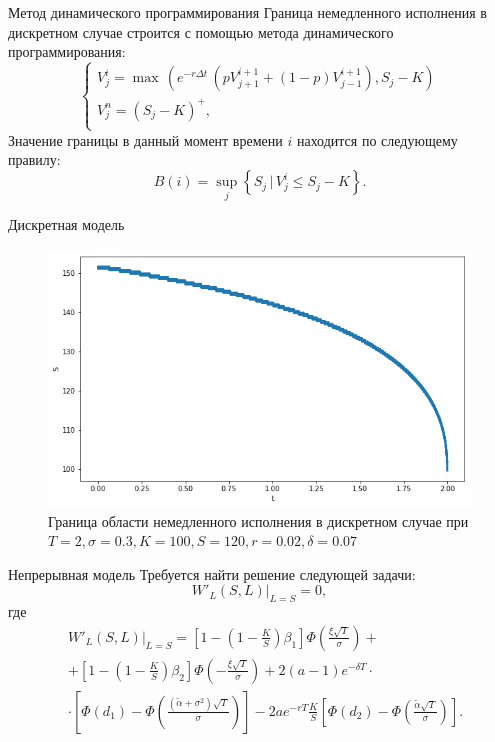 \documentclass[12pt]{beamer}
\begin{document}
\begin{frame}{Метод динамического программирования}
    Граница немедленного исполнения в дискретном случае строится с помощью метода динамического программирования:
    \begin{equation*}
		\begin{cases}
		V_j^i = \max\,(e^{-r\Delta t} \, (pV_{j+1}^{i+1}+(1-p)V_{j-1}^{i+1}),S_j-K) \\
		V_j^n = (S_j-K)^+, \\
		\end{cases}
    \end{equation*}
    Значение границы в данный момент времени $i$ находится по следующему правилу:
    $$ B(i) = \sup_j \left\{ S_j \, | \, V^i_j \leq S_j - K \right\}.$$
\end{frame}

\begin{frame}{Дискретная модель}
    \begin{figure}[h]
        \centering
        \includegraphics[scale=0.4]{Discrete.png}
        \caption{Граница области немедленного исполнения в дискретном случае при $T=2, \sigma=0.3, K=100, S=120, r=0.02, \delta=0.07$}
        \label{descrete}
    \end{figure} 
\end{frame}

\begin{frame}{Непрерывная модель}
    Требуется найти решение следующей задачи:
    $$ W'_L(S,L)\bigg|_{L=S}=0,$$
    где
    \footnotesize
    \begin{align*}
        & W'_L(S,L)\bigg|_{L=S} = \left[ 1 - \left(1-\frac{K}{S} \right)\beta_1 \right] \Phi\left(\frac{\xi\sqrt{T}}{\sigma}\right) + \\
        & + \left[ 1 - \left(1-\frac{K}{S} \right)\beta_2 \right] \Phi\left(-\frac{\xi\sqrt{T}}{\sigma}\right) + 2(a-1)e^{-\delta T} \cdot \\ 
        & \cdot \left[ \Phi\left(d_1\right) - \Phi\left(\frac{(\widetilde{\alpha}+\sigma^2)\sqrt{T}}{\sigma}\right) \right] - 2ae^{-rT}\frac{K}{S} \left[ \Phi\left(d_2\right) - \Phi\left(\frac{\widetilde{\alpha}\sqrt{T}}{\sigma}\right) \right].
    \end{align*}
\end{frame}
\end{document}
